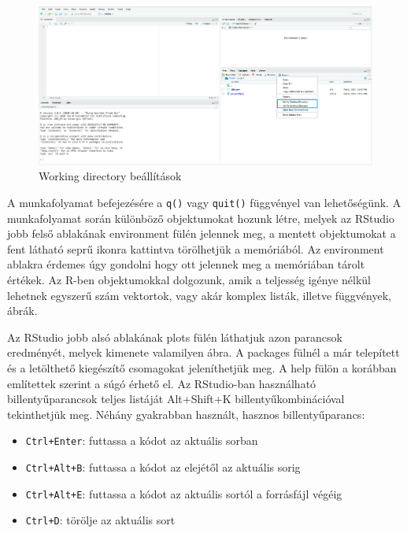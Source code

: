 \documentclass[
]{book}
\providecommand{\tightlist}{%
  \setlength{\itemsep}{0pt}\setlength{\parskip}{0pt}}
\begin{document}
\begin{figure}

{\centering \includegraphics{figures/13-03_working_directory} 

}

\caption{Working directory beállítások}\label{fig:unnamed-chunk-19}
\end{figure}

A munkafolyamat befejezésére a \texttt{q()} vagy \texttt{quit()}
függvényel van lehetőségünk. A munkafolyamat során különböző
objektumokat hozunk létre, melyek az RStudio jobb felső ablakának
environment fülén jelennek meg, a mentett objektumokat a fent látható
seprű ikonra kattintva törölhetjük a memóriából. Az environment ablakra
érdemes úgy gondolni hogy ott jelennek meg a memóriában tárolt értékek.
Az R-ben objektumokkal dolgozunk, amik a teljesség igénye nélkül
lehetnek egyszerű szám vektortok, vagy akár komplex listák, illetve
függvények, ábrák.

Az RStudio jobb alsó ablakának plots fülén láthatjuk azon parancsok
eredményét, melyek kimenete valamilyen ábra. A packages fülnél a már
telepített és a letölthető kiegészítő csomagokat jeleníthetjük meg. A
help fülön a korábban említettek szerint a súgó érhető el. Az
RStudio-ban használható billentyűparancsok teljes listáját Alt+Shift+K
billentyűkombinációval tekinthetjük meg. Néhány gyakrabban használt,
hasznos billentyűparancs:

\begin{itemize}
\tightlist
\item
  \texttt{Ctrl+Enter}: futtassa a kódot az aktuális sorban
\item
  \texttt{Ctrl+Alt+B}: futtassa a kódot az elejétől az aktuális sorig
\item
  \texttt{Ctrl+Alt+E}: futtassa a kódot az aktuális sortól a forrásfájl
  végéig
\item
  \texttt{Ctrl+D}: törölje az aktuális sort
\end{itemize}
\end{document}
